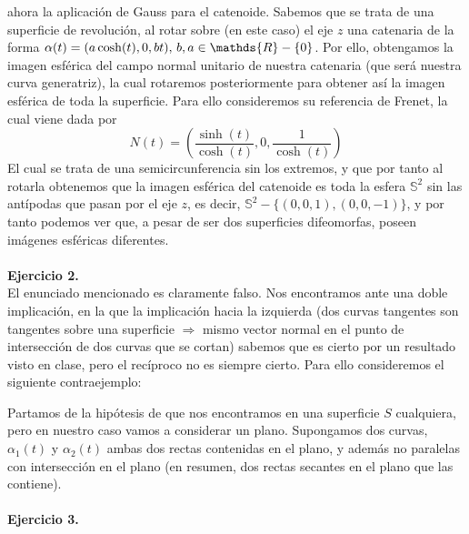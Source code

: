 \documentclass[fleqn]{article}
\def\R{\mathds{R}}
\begin{document}
    ahora la aplicación de Gauss para el catenoide. Sabemos que se trata de una superficie de revolución, al rotar sobre (en este caso) el eje $z$ una catenaria de la forma
    $\alpha(t) = (a\cosh(t), 0, bt), \thinspace b,a\in \R-\{0\}$. Por ello, obtengamos la imagen esférica del campo normal unitario de nuestra catenaria (que será nuestra curva generatriz),
    la cual rotaremos posteriormente para obtener así la imagen esférica de toda la superficie. Para ello consideremos su referencia de Frenet, la cual viene dada por
    $$N(t) = \left(\frac{\sinh(t)}{\cosh(t)}, 0, \frac{1}{\cosh(t)} \right)$$
    El cual se trata de una semicircunferencia sin los extremos, y que por tanto al rotarla obtenemos
    que la imagen esférica del catenoide es toda la esfera $\mathds{S}^2$ sin las antípodas que pasan por el eje $z$, es decir, $\mathds{S}^2 - \{(0,0,1), (0,0,-1)\}$, y por tanto podemos ver que,
    a pesar de ser dos superficies difeomorfas, poseen imágenes esféricas diferentes.\\ \\

    \textbf{Ejercicio 2. } \\

    El enunciado mencionado es claramente falso. Nos encontramos ante una doble implicación, en la que la implicación hacia la izquierda (dos curvas tangentes son tangentes sobre 
    una superficie $\Rightarrow$ mismo vector normal en el punto de intersección de dos curvas que se cortan) sabemos que es cierto por un resultado visto en clase, pero el recíproco 
    no es siempre cierto. Para ello consideremos el siguiente contraejemplo:

    Partamos de la hipótesis de que nos encontramos en una superficie $S$ cualquiera, pero en nuestro caso vamos a considerar un plano. Supongamos dos curvas, $\alpha_1(t)$ y $\alpha_2(t)$
    ambas dos rectas contenidas en el plano, y además no paralelas con intersección en el plano (en resumen, dos rectas secantes en el plano que las contiene). 
    \\ \\

    \textbf{Ejercicio 3. } \\
\end{document}
